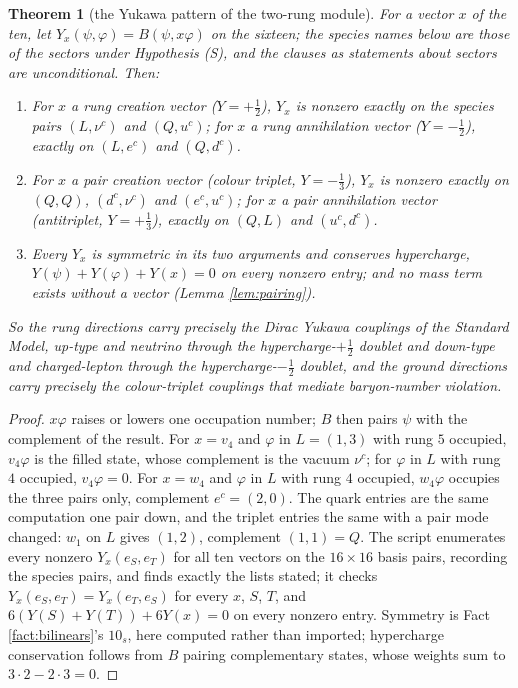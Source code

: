 \documentclass[11pt]{article}
\newtheorem{theorem}{Theorem}[section]
\theoremstyle{definition}
\begin{document}
\begin{theorem}[the Yukawa pattern of the two-rung module]\label{thm:yukawa}
For a vector $x$ of the ten, let $Y_{x}(\psi, \varphi) = B(\psi, x\varphi)$ on the sixteen; the species names below are those of the sectors under Hypothesis (S), and the clauses as statements about sectors are unconditional. Then:
\begin{enumerate}
\item[(i)] For $x$ a rung creation vector ($Y = +\tfrac12$), $Y_{x}$ is nonzero exactly on the species pairs $(L, \nu^{c})$ and $(Q, u^{c})$; for $x$ a rung annihilation vector ($Y = -\tfrac12$), exactly on $(L, e^{c})$ and $(Q, d^{c})$.
\item[(ii)] For $x$ a pair creation vector (colour triplet, $Y = -\tfrac13$), $Y_{x}$ is nonzero exactly on $(Q, Q)$, $(d^{c}, \nu^{c})$ and $(e^{c}, u^{c})$; for $x$ a pair annihilation vector (antitriplet, $Y = +\tfrac13$), exactly on $(Q, L)$ and $(u^{c}, d^{c})$.
\item[(iii)] Every $Y_{x}$ is symmetric in its two arguments and conserves hypercharge, $Y(\psi) + Y(\varphi) + Y(x) = 0$ on every nonzero entry; and no mass term exists without a vector (Lemma \ref{lem:pairing}).
\end{enumerate}
So the rung directions carry precisely the Dirac Yukawa couplings of the Standard Model, up-type and neutrino through the hypercharge-$+\tfrac12$ doublet and down-type and charged-lepton through the hypercharge-$-\tfrac12$ doublet, and the ground directions carry precisely the colour-triplet couplings that mediate baryon-number violation.
\end{theorem}

\begin{proof}
$x\varphi$ raises or lowers one occupation number; $B$ then pairs $\psi$ with the complement of the result. For $x = v_{4}$ and $\varphi$ in $L = (1,3)$ with rung $5$ occupied, $v_{4}\varphi$ is the filled state, whose complement is the vacuum $\nu^{c}$; for $\varphi$ in $L$ with rung $4$ occupied, $v_{4}\varphi = 0$. For $x = w_{4}$ and $\varphi$ in $L$ with rung $4$ occupied, $w_{4}\varphi$ occupies the three pairs only, complement $e^{c} = (2,0)$. The quark entries are the same computation one pair down, and the triplet entries the same with a pair mode changed: $w_{1}$ on $L$ gives $(1,2)$, complement $(1,1) = Q$. The script enumerates every nonzero $Y_{x}(e_{S}, e_{T})$ for all ten vectors on the $16 \times 16$ basis pairs, recording the species pairs, and finds exactly the lists stated; it checks $Y_{x}(e_{S}, e_{T}) = Y_{x}(e_{T}, e_{S})$ for every $x$, $S$, $T$, and $6(Y(S) + Y(T)) + 6Y(x) = 0$ on every nonzero entry. Symmetry is Fact \ref{fact:bilinears}'s $10_{s}$, here computed rather than imported; hypercharge conservation follows from $B$ pairing complementary states, whose weights sum to $3 \cdot 2 - 2 \cdot 3 = 0$.
\end{proof}
\end{document}
